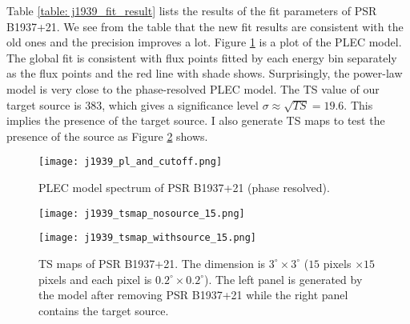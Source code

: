 \documentclass[a4paper, 12pt]{report}
\begin{document}
        Table \ref{table: j1939_fit_result} lists the results of the fit parameters of 
        PSR B1937+21. We see from the table that the new fit results are 
        consistent with the old ones and the precision improves a lot. 
        Figure \ref{fig: j1939_pl_and_cutoff} is a plot of the PLEC model.
        The global fit is consistent with flux points fitted by each energy bin separately 
        as the flux points and the red line with shade shows. Surprisingly, the power-law model
        is very close to the phase-resolved PLEC model. 
        The TS value of our target source is $383$, which gives 
        a significance level $\sigma \approx \sqrt{TS} = 19.6$. This implies the presence 
        of the target source. I also generate TS maps to test the presence of the source 
        as Figure \ref{fig: j1939_tsmap_comparison_15} shows. 
        
        \begin{figure}[!htp]
          \centering 
          \texttt{[image: j1939\_pl\_and\_cutoff.png]}
          \caption{PLEC model spectrum of PSR B1937+21 (phase resolved). }
          \label{fig: j1939_pl_and_cutoff}
        \end{figure}
          
        \begin{figure}[!htp]
          \centering
          \begin{minipage}{0.40\textwidth}
            \begin{center} 
              \texttt{[image: j1939\_tsmap\_nosource\_15.png]}
            \end{center}
          \end{minipage}
          \begin{minipage}{0.40\textwidth}
            \begin{center}
              \texttt{[image: j1939\_tsmap\_withsource\_15.png]}
            \end{center}
          \end{minipage}
          \caption[TS maps of PSR B1937+21.]
            {TS maps of PSR B1937+21. The dimension is $3^{\circ} \times 3^{\circ}$
            ($15$ pixels $\times 15$ pixels and each pixel is 
            $0.2^{\circ} \times 0.2^{\circ}$). The left panel is generated by the model 
            after removing PSR B1937+21 while the right panel contains the target source.}
          \label{fig: j1939_tsmap_comparison_15}
        \end{figure}
\end{document}
